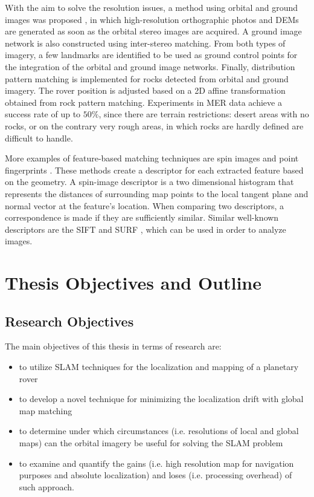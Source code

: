 With the aim to solve the resolution issues, a method using orbital and
ground images was proposed \parencite{Hwangbo2009}, in which
high-resolution orthographic photos and DEMs are generated as soon as the
orbital stereo images are acquired.
A ground image network is also constructed using inter-stereo matching.
From both types of imagery, a few landmarks are identified to be used as
ground control points for the integration of the orbital and ground
image networks.
Finally, distribution pattern matching is implemented for rocks detected
from orbital and ground imagery.
The rover position is adjusted based on a 2D affine transformation
obtained from rock pattern matching.
Experiments in MER data achieve a success rate of up to $50\%$, since
there are terrain restrictions: desert areas with no rocks,
or on the contrary very rough areas, in which rocks are hardly
defined are difficult to handle.

More examples of feature-based matching techniques are spin images
\parencite{Johnson1997} and point fingerprints \parencite{Sun2003}.
These methods create a descriptor for each extracted feature based on the
geometry.
A spin-image descriptor is a two dimensional histogram that
represents the distances of surrounding map points to the local tangent
plane and normal vector at the feature’s location.
When comparing two descriptors, a correspondence is made if they are
sufficiently similar.
Similar well-known descriptors are the SIFT \parencite{Lowe2004}
and SURF \parencite{Bay2006}, which can be used in order to analyze images.

\section{Thesis Objectives and Outline}

\subsection{Research Objectives}

The main objectives of this thesis in terms of research are:

\begin{itemize}
    \item to utilize SLAM techniques for the localization and mapping
        of a planetary rover
    \item to develop a novel technique for minimizing the localization
        drift with global map matching
    \item to determine under which circumstances (i.e. resolutions of
        local and global maps) can the orbital imagery be useful for
        solving the SLAM problem
    \item to examine and quantify the gains (i.e. high resolution map for
        navigation purposes and absolute localization) and loses
        (i.e. processing overhead) of such approach.
\end{itemize}

